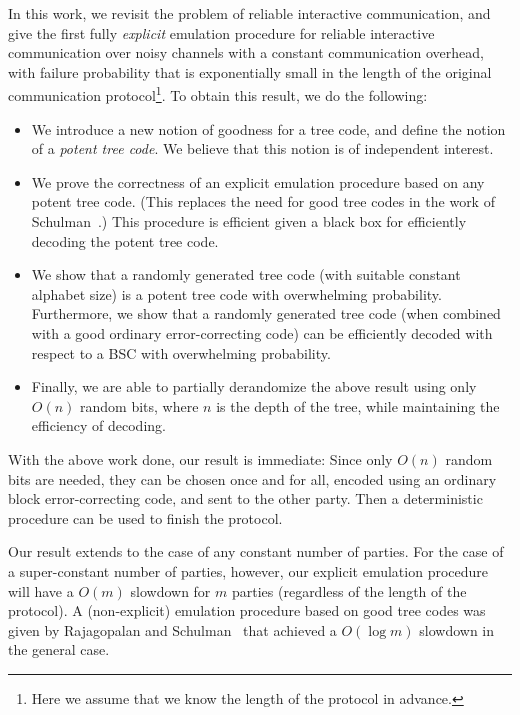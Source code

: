 \documentclass[ letterpaper, 11pt]{article}
\newcommand{\potent}{potent\xspace}
\begin{document}
In this work, we revisit the problem of reliable interactive
communication, and give the first fully \emph{explicit} emulation
procedure for reliable interactive communication over noisy channels
with a constant communication overhead,  with failure probability
that is exponentially small in the length of the original
communication protocol\footnote{Here we assume that we know the
length of the protocol in advance.}.  To obtain this result, we do
the following:

\begin{itemize}\addtolength{\itemsep}{-0.5em}
\item
We introduce a new notion of goodness for a tree code, and define
the notion of a \emph{\potent tree code}.  We believe that this
notion is of independent interest.
\item
We prove the correctness of an explicit emulation procedure based on
any \potent tree code.  (This replaces the need for good tree codes
in the work of Schulman~\cite{schulman93}.)  This procedure is
efficient given a black box for efficiently decoding the \potent
tree code.
\item
We show that a randomly generated tree code (with suitable constant
alphabet size) is a \potent tree code with overwhelming probability.
Furthermore, we show that a randomly generated tree code (when
combined with a good ordinary error-correcting code) can be
efficiently decoded with respect to a BSC with overwhelming
probability.

\item
Finally, we are able to partially derandomize the above result using
only $O(n)$ random bits, where $n$ is the depth of the tree, while
maintaining the efficiency of decoding.
\end{itemize}

With the above work done, our result is immediate: Since only $O(n)$
random bits are needed, they can be chosen once and for all, encoded
using an ordinary block error-correcting code, and sent to the other
party.  Then a deterministic procedure can be used to finish the
protocol.

Our result extends to the case of any constant number of parties.
For the case of a super-constant number of parties, however, our
explicit emulation procedure will have a $O(m)$ slowdown for $m$
parties (regardless of the length of the protocol).  A
(non-explicit) emulation procedure based on good tree codes was
given by Rajagopalan and Schulman~\cite{RS94} that achieved a
$O(\log m)$ slowdown in the general case.
\end{document}
